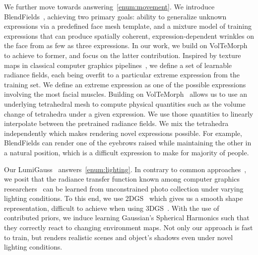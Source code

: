   We further move towards answering~\ref{enum:movement}.
  We introduce BlendFields~\cite{kania2023blendfields}, achieving two primary
  goals: ability to generalize unknown expressions via a predefined face mesh
  template, and a mixture model of training expressions that can produce
  spatially coherent, expression-dependent wrinkles on the face from as few as
  three expressions.
  In our work, we build on VolTeMorph~\cite{garbin2024voltemorph} to achieve
  to former, and focus on the latter contribution.
  Inspired by texture maps in classical computer graphics
  pipelines~\cite{oat2007animated}, we define a set of learnable radiance
  fields, each being overfit to a particular extreme expression from the
  training set.
  We define an extreme expression as one of the possible expressions involving
  the most facial muscles.
  Building on VolTeMorph~\cite{garbin2024voltemorph} allows us to use an
  underlying tetrahedral mesh to compute physical quantities such as the
  volume change of tetrahedra under a given expression.
  We use those quantities to linearly interpolate between the pretrained
  radiance fields.
  We mix the tetrahedra independently which makes rendering novel expressions
  possible.
  For example, BlendFields can render one of the eyebrows raised while
  maintaining the other in a natural position, which is a difficult expression
  to make for majority of people.

  Our LumiGauss~\cite{kaleta2024lumigauss} answers~\ref{enum:lighting}.
  In contrary to common approaches~\cite{rudnev2022nerfosr}, we posit that the
  radiance transfer function known among computer graphics
  researchers~\cite{ramamoorthi2001envmap} can be learned from unconstrained
  photo collection under varying lighting conditions.
  To this end, we use 2DGS~\cite{huang20242d} which gives us a smooth shape
  representation, difficult to achieve when using 3DGS~\cite{kerbl20233d}.
  With the use of contributed priors, we induce learning Gaussian's Spherical
  Harmonics such that they correctly react to changing environment maps.
  Not only our approach is fast to train, but renders realistic scenes and
  object's shadows even under novel lighting conditions.

